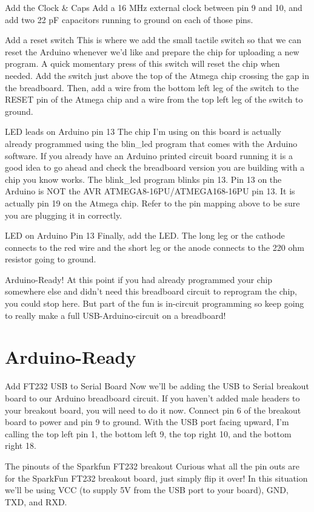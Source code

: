 Add the Clock \& Caps
Add a 16 MHz external clock between pin 9 and 10, and add two 22 pF capacitors running to ground on each of those pins.


Add a reset switch
This is where we add the small tactile switch so that we can reset the Arduino whenever we'd like and prepare the chip for uploading a new program. A quick momentary press of this switch will reset the chip when needed. Add the switch just above the top of the Atmega chip crossing the gap in the breadboard. Then, add a wire from the bottom left leg of the switch to the RESET pin of the Atmega chip and a wire from the top left leg of the switch to ground.


LED leads on Arduino pin 13
The chip I'm using on this board is actually already programmed using the blin\_led program that comes with the Arduino software. If you already have an Arduino printed circuit board running it is a good idea to go ahead and check the breadboard version you are building with a chip you know works. The blink\_led program blinks pin 13. Pin 13 on the Arduino is NOT the AVR ATMEGA8-16PU/ATMEGA168-16PU pin 13. It is actually pin 19 on the Atmega chip.
Refer to the pin mapping above to be sure you are plugging it in correctly.


LED on Arduino Pin 13
Finally, add the LED. The long leg or the cathode connects to the red wire and the short leg or the anode connects to the 220 ohm resistor going to ground.


Arduino-Ready!
At this point if you had already programmed your chip somewhere else and didn't need this breadboard circuit to reprogram the chip, you could stop here. But part of the fun is in-circuit programming so keep going to really make a full USB-Arduino-circuit on a breadboard!

\section{Arduino-Ready}


Add FT232 USB to Serial Board
Now we'll be adding the USB to Serial breakout board to our Arduino breadboard circuit. If you haven't added male headers to your breakout board, you will need to do it now.
Connect pin 6 of the breakout board to power and pin 9 to ground. With the USB port facing upward, I'm calling the top left pin 1, the bottom left 9, the top right 10, and the bottom right 18.


The pinouts of the Sparkfun FT232 breakout
Curious what all the pin outs are for the SparkFun FT232 breakout board, just simply flip it over! In this situation we'll be using VCC (to supply 5V from the USB port to your board), GND, TXD, and RXD.



